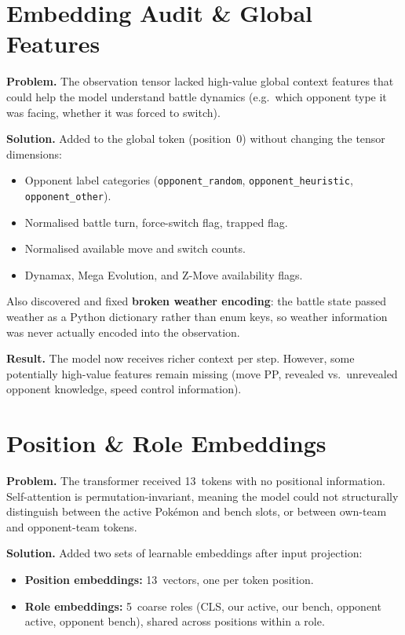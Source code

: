 \section{Embedding Audit \& Global Features}

\textbf{Problem.} The observation tensor lacked high-value global context
features that could help the model understand battle dynamics (e.g.\ which
opponent type it was facing, whether it was forced to switch).

\textbf{Solution.} Added to the global token (position~0) without changing
the tensor dimensions:
\begin{itemize}
  \item Opponent label categories (\texttt{opponent\_random},
        \texttt{opponent\_heuristic}, \texttt{opponent\_other}).
  \item Normalised battle turn, force-switch flag, trapped flag.
  \item Normalised available move and switch counts.
  \item Dynamax, Mega Evolution, and Z-Move availability flags.
\end{itemize}

Also discovered and fixed \textbf{broken weather encoding}: the battle state
passed weather as a Python dictionary rather than enum keys, so weather
information was never actually encoded into the observation.

\textbf{Result.} The model now receives richer context per step.  However,
some potentially high-value features remain missing (move PP, revealed vs.\
unrevealed opponent knowledge, speed control information).

\section{Position \& Role Embeddings}

\textbf{Problem.} The transformer received 13~tokens with no positional
information.  Self-attention is permutation-invariant, meaning the model
could not structurally distinguish between the active Pok\'{e}mon and bench
slots, or between own-team and opponent-team tokens.

\textbf{Solution.} Added two sets of learnable embeddings after input
projection:
\begin{itemize}
  \item \textbf{Position embeddings:} 13~vectors, one per token position.
  \item \textbf{Role embeddings:} 5~coarse roles (CLS, our active, our bench,
        opponent active, opponent bench), shared across positions within a role.
\end{itemize}

